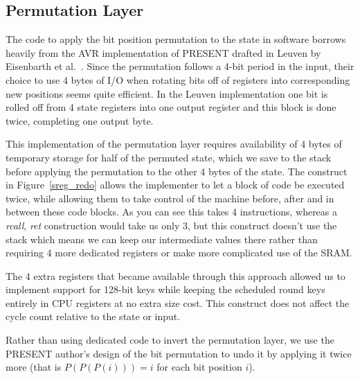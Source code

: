 \documentclass[11pt]{llncs2e} %
\begin{document}
\subsection{Permutation Layer}
The code to apply the bit position permutation to the state in software borrows heavily from the AVR implementation of PRESENT drafted in Leuven by Eisenbarth et al.~\cite{eisenbarth2012compact}.
Since the permutation follows a 4-bit period in the input, their choice to use 4 bytes of I/O when rotating bits off of registers into corresponding new positions seems quite efficient.
In the Leuven implementation one bit is rolled off from 4 state registers into one output register and this block is done twice, completing one output byte.

This implementation of the permutation layer requires availability of 4 bytes of temporary storage for half of the permuted state, which we save to the stack before applying the permutation to the other 4 bytes of the state.
The construct in Figure~\ref{sreg_redo} allows the implementer to let a block of code be executed twice, while allowing them to take control of the machine before, after and in between these code blocks.
As you can see this takes 4 instructions, whereas a \textit{rcall}, \textit{ret} construction would take us only 3, but this construct doesn't use the stack which means we can keep our intermediate values there rather than requiring 4 more dedicated registers or make more complicated use of the SRAM.


The 4 extra registers that became available through this approach allowed us to implement support for 128-bit keys while keeping the scheduled round keys entirely in CPU registers at no extra size cost.
This construct does not affect the cycle count relative to the state or input.

Rather than using dedicated code to invert the permutation layer, we use the PRESENT author's design of the bit permutation to undo it by applying it twice more (that is $P(P(P(i))) = i$ for each bit position $i$).
\end{document}
